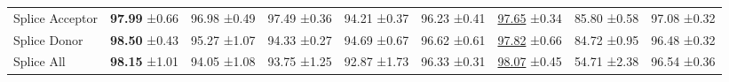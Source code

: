 \begin{table}[h]
{\begin{tabular}{lrrrr>{\columncolor{low}}rrrr}
    \midrule
    Splice Acceptor & \textbf{97.99} \small{±0.66}  &  96.98 \small{±0.49} &  97.49 \small{±0.36} &  94.21 \small{±0.37} &  96.23 \small{±0.41} & \underline{97.65} \small{±0.34} & 85.80 \small{±0.58} & 97.08 \small{±0.32} \\
    Splice Donor    & \textbf{98.50} \small{±0.43}  &  95.27 \small{±1.07} &  94.33 \small{±0.27} &  94.69 \small{±0.67} &  96.62 \small{±0.61} & \underline{97.82} \small{±0.66} & 84.72 \small{±0.95} & 96.48 \small{±0.32} \\
    Splice All      & \textbf{98.15} \small{±1.01}  &  94.05 \small{±1.08} &  93.75 \small{±1.25} &  92.87 \small{±1.73} &  96.33 \small{±0.31} & \underline{98.07} \small{±0.45} & 54.71 \small{±2.38} & 96.54 \small{±0.36} \\
    \bottomrule
  \end{tabular}
  }
\end{table}

